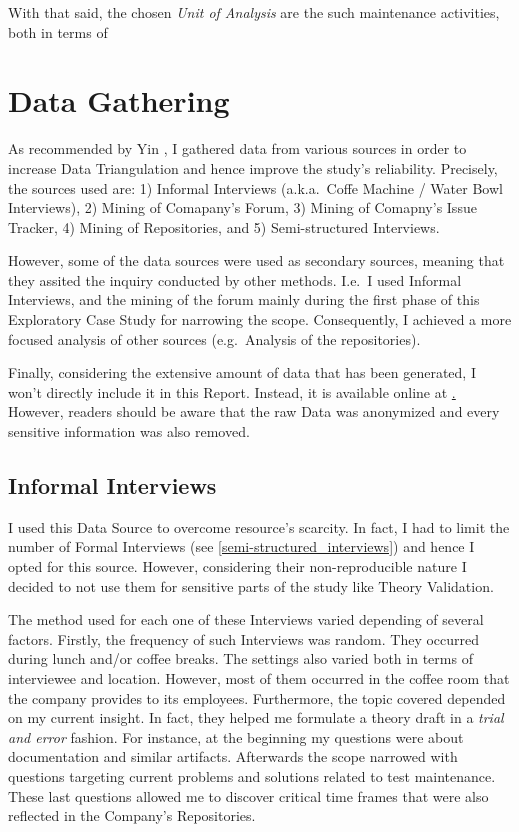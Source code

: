 With that said, the chosen \textit{Unit of Analysis} are the such maintenance activities, both in terms of 
    

%
%
%
%

%
%
%
%
\section{Data Gathering}
As recommended by Yin \cite{case_study_guide,case_study_software_engineering}, I gathered data from various sources in order to increase Data Triangulation and hence improve the study's reliability. Precisely, the sources used are: 1) Informal Interviews (a.k.a.\ Coffe Machine / Water Bowl Interviews), 2) Mining of Comapany's Forum, 3) Mining of Comapny's Issue Tracker, 4) Mining of Repositories, and 5) Semi-structured Interviews.

However, some of the data sources were used as secondary sources, meaning that they assited the inquiry conducted by other methods. I.e.\ I used Informal Interviews, and the mining of the forum mainly during the first phase of this Exploratory Case Study for narrowing the scope. Consequently, I achieved a more focused analysis of other sources (e.g.\ Analysis of the repositories).

Finally, considering the extensive amount of data that has been generated, I won't directly include it in this Report. Instead, it is available online at \href{http://somthing/}. However, readers should be aware that the raw Data was anonymized and every sensitive information was also removed. 


\subsection{Informal Interviews}
I used this Data Source to overcome resource's scarcity. In fact, I had to limit the number of Formal Interviews (see \ref{semi-structured_interviews}) and hence I opted for this source. However, considering their non-reproducible nature I decided to not use them for sensitive parts of the study like Theory Validation. 

The method used for each one of these Interviews varied depending of several factors. Firstly, the frequency of such Interviews was random. They occurred during lunch and/or coffee breaks. The settings also varied both in terms of interviewee and location. However, most of them occurred in the coffee room that the company provides to its employees. Furthermore, the topic covered depended on my current insight. In fact, they helped me formulate a theory draft in a \textit{trial and error} fashion. For instance, at the beginning my questions were about documentation and similar artifacts. Afterwards the scope narrowed with questions targeting current problems and solutions related to test maintenance. These last questions allowed me to discover critical time frames that were also reflected in the Company's Repositories.

